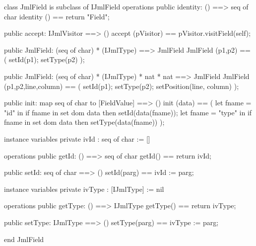 \begin{vdm_al}
class JmlField is subclass of IJmlField
operations
  public identity: () ==> seq of char
  identity () == return "Field";

  public accept: IJmlVisitor ==> ()
  accept (pVisitor) == pVisitor.visitField(self);

  public JmlField:
    (seq of char) *
    (IJmlType) ==> JmlField
  JmlField (p1,p2) == 
    ( setId(p1);
      setType(p2) );

  public JmlField:
    (seq of char) *
    (IJmlType) *
    nat *
    nat ==> JmlField
  JmlField (p1,p2,line,column) == 
    ( setId(p1);
      setType(p2);
      setPosition(line, column) );

  public init: map seq of char to [FieldValue] ==> ()
  init (data) ==
    ( let fname = "id" in
        if fname in set dom data
        then setId(data(fname));
      let fname = "type" in
        if fname in set dom data
        then setType(data(fname)) );

instance variables
  private ivId : seq of char := []

operations
  public getId: () ==> seq of char
  getId() == return ivId;

  public setId: seq of char ==> ()
  setId(parg) == ivId := parg;

instance variables
  private ivType : [IJmlType] := nil

operations
  public getType: () ==> IJmlType
  getType() == return ivType;

  public setType: IJmlType ==> ()
  setType(parg) == ivType := parg;

end JmlField
\end{vdm_al}

